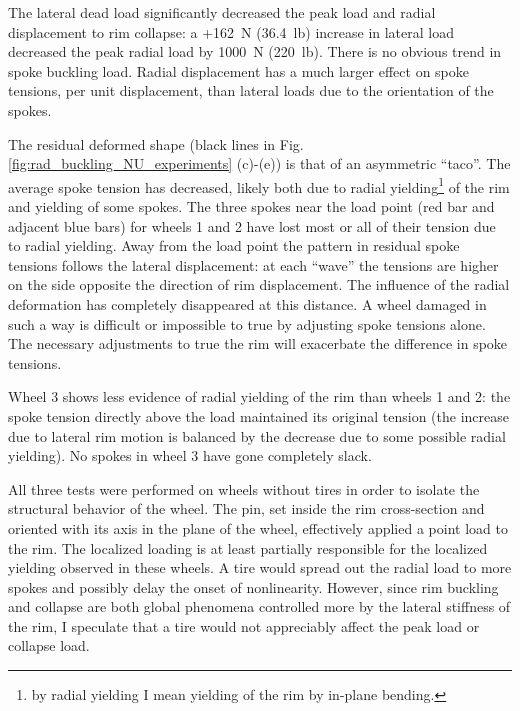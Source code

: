 \documentclass[\rootdir/thesis.tex]{subfiles}
\begin{document}
The lateral dead load significantly decreased the peak load and radial displacement to rim collapse: a +\SI{162}{N} (\SI{36.4}{lb}) increase in lateral load decreased the peak radial load by \SI{1000}{N} (\SI{220}{lb}). There is no obvious trend in spoke buckling load. Radial displacement has a much larger effect on spoke tensions, per unit displacement, than lateral loads due to the orientation of the spokes.

The residual deformed shape (black lines in Fig. \ref{fig:rad_buckling_NU_experiments} (c)-(e)) is that of an asymmetric ``taco''. The average spoke tension has decreased, likely both due to radial yielding\footnote{by radial yielding I mean yielding of the rim by in-plane bending.} of the rim and yielding of some spokes. The three spokes near the load point (red bar and adjacent blue bars) for wheels 1 and 2 have lost most or all of their tension due to radial yielding. Away from the load point the pattern in residual spoke tensions follows the lateral displacement: at each ``wave'' the tensions are higher on the side opposite the direction of rim displacement. The influence of the radial deformation has completely disappeared at this distance. A wheel damaged in such a way is difficult or impossible to true by adjusting spoke tensions alone. The necessary adjustments to true the rim will exacerbate the difference in spoke tensions.

Wheel 3 shows less evidence of radial yielding of the rim than wheels 1 and 2: the spoke tension directly above the load maintained its original tension (the increase due to lateral rim motion is balanced by the decrease due to some possible radial yielding). No spokes in wheel 3 have gone completely slack.

All three tests were performed on wheels without tires in order to isolate the structural behavior of the wheel. The pin, set inside the rim cross-section and oriented with its axis in the plane of the wheel, effectively applied a point load to the rim. The localized loading is at least partially responsible for the localized yielding observed in these wheels. A tire would spread out the radial load to more spokes and possibly delay the onset of nonlinearity. However, since rim buckling and collapse are both global phenomena controlled more by the lateral stiffness of the rim, I speculate that a tire would not appreciably affect the peak load or collapse load.
\end{document}
